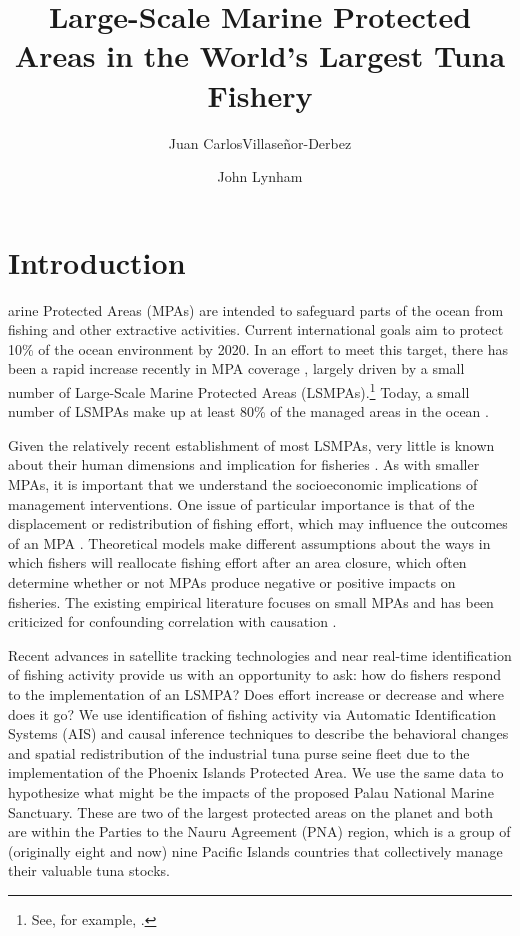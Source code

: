 \documentclass[9pt,twoside,lineno]{pnas-new}
\title{Large-Scale Marine Protected Areas in the World's Largest Tuna Fishery}
\author[a,1]{Juan CarlosVillase\~{n}or-Derbez}
\author[b,1]{John Lynham}
\affil[a]{Bren School of Environmental Science \& Management, University of California at Santa Barbara, Santa Barbara, CA}
\affil[b]{Department of Economics, University of Hawaii at Manoa, Honolulu, HI}
\begin{document}
\maketitle
\thispagestyle{firststyle}






\section{Introduction}\label{introduction}

arine Protected Areas (MPAs) are intended to safeguard parts of the
ocean from fishing and other extractive activities. Current
international goals aim to protect 10\% of the ocean environment by
2020. In an effort to meet this target, there has been a rapid
increase recently in MPA coverage \citep{wood_2008,sala_2018}, largely driven by
a small number of Large-Scale Marine Protected Areas (LSMPAs).\footnote{See, for example, \citep{game_2009,singleton_2014,boonzaier_2016,mccauley_2016,alger_2017}.}
Today, a small number of LSMPAs make up at least 80\%
of the managed areas in the ocean \citep{toonen_2013}.

Given the relatively recent establishment of most LSMPAs, very little is
known about their human dimensions and implication for fisheries
\citep{gray_2017}. As with smaller MPAs, it is important that we
understand the socioeconomic implications of management interventions.
One issue of particular importance is that of the displacement or
redistribution of fishing effort, which may influence the outcomes of an
MPA \citep{smith_2003}. Theoretical models make different assumptions
about the ways in which fishers will reallocate fishing effort after an
area closure, which often determine whether or not MPAs produce negative or positive impacts on fisheries. The existing empirical literature focuses on small MPAs and has been criticized for confounding correlation with causation \citep{ferraro2018causal}.

Recent advances in satellite tracking technologies and near real-time
identification of fishing activity provide us with an opportunity to ask: how do fishers respond to the implementation of an LSMPA? Does effort increase or decrease and where does it go? We use identification of fishing activity via Automatic
Identification Systems (AIS) and causal inference techniques to describe
the behavioral changes and spatial redistribution of the industrial tuna
purse seine fleet due to the implementation of the Phoenix Islands Protected Area. We use the same data to hypothesize what might be the impacts of the proposed Palau National Marine Sanctuary. These are two of the largest protected areas on the planet and both are within the Parties to the Nauru Agreement (PNA) region, which is a group of (originally eight and now) nine Pacific Islands countries that collectively manage their valuable tuna stocks.
\end{document}
